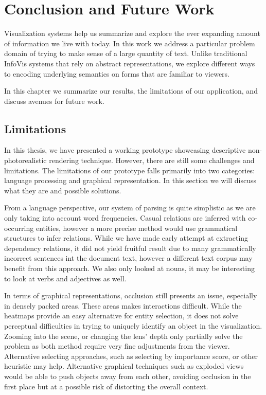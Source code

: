 \chapter{Conclusion and Future Work}
Visualization systems help us summarize and explore the ever expanding amount of
information we live with today. In this work we address a particular problem
domain of trying to make sense of a large quantity of text. Unlike traditional
InfoVis systems that rely on abstract representations, we explore different ways
to encoding underlying semantics on forms that are familiar to viewers. 

In this chapter we summarize our results, the limitations of our
application, and discuss avenues for future work.

\section{Limitations}
In this thesis, we have presented a working prototype showcasing descriptive
non-photorealistic rendering technique. However, there are still some challenges
and limitations. The limitations of our prototype falls primarily into two
categories: language processing and graphical representation. In this section we
will discuss what they are and possible solutions.

From a language perspective, our system of parsing is quite simplistic as we are
only taking into account word frequencies. Casual relations are inferred with
co-occurring entities, however a more precise method would use grammatical
structures to infer relations. While we have made early attempt at extracting
dependency relations, it did not yield fruitful result due to many grammatically
incorrect sentences int the document text, however a different text
corpus may benefit from this approach. We also only looked at nouns, it may be
interesting to look at verbs and adjectives as well.

In terms of graphical representations, occlusion still presents an issue,
especially in densely packed areas. These areas makes interactions difficult.
While the heatmaps provide an easy alternative for entity selection, it does not
solve perceptual difficulties in trying to uniquely identify an object in the
visualization. Zooming into the scene, or changing the lens' depth only
partially solve the problem as both method require very fine adjustments from
the viewer. Alternative selecting approaches, such as selecting by importance score,
or other heuristic may help. Alternative graphical techniques such as exploded
views would be able to push objects away from each other, avoiding occlusion in
the first place but at a possible risk of distorting the overall context.


